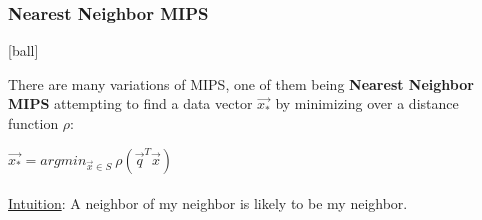 \documentclass{beamer}
\begin{document}

\begin{frame}[fragile]
\begin{itemize}
\frametitle{Nearest Neighbor MIPS}
[ball]

\item There are many variations of MIPS, one of them being \textbf{Nearest Neighbor MIPS} attempting to find a data vector $\overrightarrow{x_{*}}$ by minimizing over a distance function $\rho$:

\begin{center}
    \item[] $\overrightarrow{x_{*}} = argmin_{\overrightarrow{x} \in S} \ \rho(\overrightarrow{q}^T \overrightarrow{x}) $ \\~\\
    \underline{Intuition}: A neighbor of my neighbor is likely to be my neighbor.
\end{center}

\end{itemize}
\end{frame}

\end{document}
